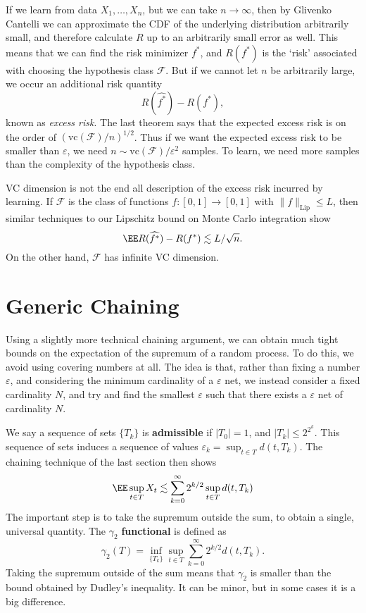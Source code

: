If we learn from data $X_1, \dots, X_n$, but we can take $n \to \infty$, then by Glivenko Cantelli we can approximate the CDF of the underlying distribution arbitrarily small, and therefore calculate $R$ up to an arbitrarily small error as well. This means that we can find the risk minimizer $f^*$, and $R(f^*)$ is the `risk' associated with choosing the hypothesis class $\mathcal{F}$. But if we cannot let $n$ be arbitrarily large, we occur an additional risk quantity
%
\[ R \left( \widehat{f^*} \right) - R(f^*), \]
%
known as {\it excess risk}. The last theorem says that the expected excess risk is on the order of $(\text{vc}(\mathcal{F})/n)^{1/2}$. Thus if we want the expected excess risk to be smaller than $\varepsilon$, we need $n \sim \text{vc}(\mathcal{F})/\varepsilon^2$ samples. To learn, we need more samples than the complexity of the hypothesis class.

\begin{remark}
	VC dimension is not the end all description of the excess risk incurred by learning. If $\mathcal{F}$ is the class of functions $f: [0,1] \to [0,1]$ with $\| f \|_{\text{Lip}} \leq L$, then similar techniques to our Lipschitz bound on Monte Carlo integration show
	\[ \EE R(\widehat{f^*}) - R(f^*) \lesssim L / \sqrt{n}. \]
	On the other hand, $\mathcal{F}$ has infinite VC dimension.
\end{remark}

\section{Generic Chaining}

Using a slightly more technical chaining argument, we can obtain much tight bounds on the expectation of the supremum of a random process. To do this, we avoid using covering numbers at all. The idea is that, rather than fixing a number $\varepsilon$, and considering the minimum cardinality of a $\varepsilon$ net, we instead consider a fixed cardinality $N$, and try and find the smallest $\varepsilon$ such that there exists a $\varepsilon$ net of cardinality $N$.

We say a sequence of sets $\{ T_k \}$ is \textbf{admissible} if $|T_0| = 1$, and $|T_k| \leq 2^{2^k}$. This sequence of sets induces a sequence of values $\varepsilon_k = \sup_{t \in T} d(t,T_k)$. The chaining technique of the last section then shows
%
\[ \EE \sup_{t \in T} X_t \lesssim \sum_{k = 0}^\infty 2^{k/2} \sup_{t \in T} d(t,T_k) \]
%
The important step is to take the supremum outside the sum, to obtain a single, universal quantity. The $\gamma_2$ \textbf{functional} is defined as
%
\[ \gamma_2(T) = \inf_{\{ T_k \}} \sup_{t \in T} \sum_{k = 0}^\infty 2^{k/2} d(t,T_k). \]
%
Taking the supremum outside of the sum means that $\gamma_2$ is smaller than the bound obtained by Dudley's inequality. It can be minor, but in some cases it is a big difference.

